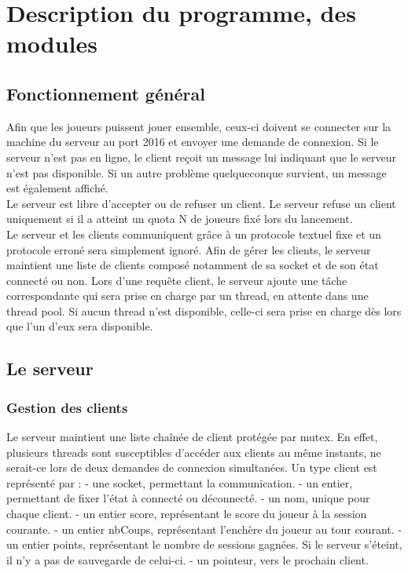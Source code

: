 \documentclass[11pt]{article}
\begin{document}
\section{Description du programme, des modules}
\subsection{Fonctionnement général}
Afin que les joueurs puissent jouer ensemble, ceux-ci doivent se connecter sur la machine du serveur au port 2016 et envoyer une demande de connexion. Si le serveur n'est pas en ligne, le client reçoit un message lui indiquant que le serveur n'est pas disponible. Si un autre problème quelqueconque survient, un message est également affiché.\\
Le serveur est libre d'accepter ou de refuser un client. Le serveur refuse un client uniquement si il a atteint un quota N de joueurs fixé lors du lancement.\\
Le serveur et les clients communiquent grâce à un protocole textuel fixe et un protocole erroné sera simplement ignoré. Afin de gérer les clients, le serveur maintient une liste de clients composé notamment de sa socket et de son état connecté ou non. Lors d'une requête client, le serveur ajoute une tâche correspondante qui sera prise en charge par un thread, en attente dans une thread pool. Si aucun thread n'est disponible, celle-ci sera prise en charge dès lors que l'un d'eux sera disponible.\\


\subsection{Le serveur}
\subsubsection{Gestion des clients}
Le serveur maintient une liste chaînée de client protégée par mutex. En effet, plusieurs threads sont susceptibles d'accéder aux clients au même instants, ne serait-ce lors de deux demandes de connexion simultanées. Un type client est représenté par : 
- une socket, permettant la communication.
- un entier, permettant de fixer l'état à connecté ou déconnecté.
- un nom, unique pour chaque client.
- un entier score, représentant le score du joueur à la session courante.
- un entier nbCoups, représentant l'enchère du joueur au tour courant.
- un entier points, représentant le nombre de sessions gagnées. Si le serveur s'éteint, il n'y a pas de sauvegarde de celui-ci.
- un pointeur, vers le prochain client.
\end{document}
